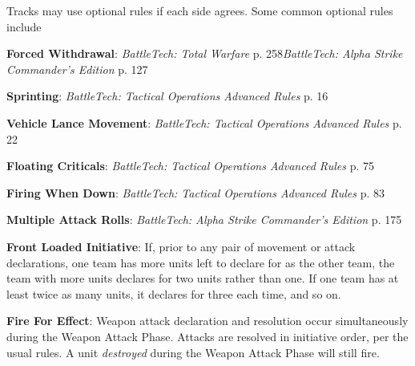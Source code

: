 Tracks may use optional rules if each side agrees.
Some common optional rules include

\begin{description}

\item {\bfseries Forced Withdrawal}: \emph{BattleTech: Total Warfare} p. 258\emph{BattleTech: Alpha Strike Commander's Edition} p. 127

\item {\bfseries Sprinting}: \emph{BattleTech: Tactical Operations Advanced Rules} p. 16

\item {\bfseries Vehicle Lance Movement}: \emph{BattleTech: Tactical Operations Advanced Rules} p. 22

\item {\bfseries Floating Criticals}: \emph{BattleTech: Tactical Operations Advanced Rules} p. 75

\item {\bfseries Firing When Down}: \emph{BattleTech: Tactical Operations Advanced Rules} p. 83

\item {\bfseries Multiple Attack Rolls}: \emph{BattleTech: Alpha Strike Commander's Edition} p. 175

\item {\bfseries Front Loaded Initiative}: If, prior to any pair of movement or attack declarations, one team has more units left to declare for as the other team, the team with more units declares for two units rather than one.
If one team has at least twice as many units, it declares for three each time, and so on.

\item {\bfseries Fire For Effect}: Weapon attack declaration and resolution occur simultaneously during the Weapon Attack Phase.
Attacks are resolved in initiative order, per the usual rules.
A unit \emph{destroyed} during the Weapon Attack Phase will still fire.

\end{description}
